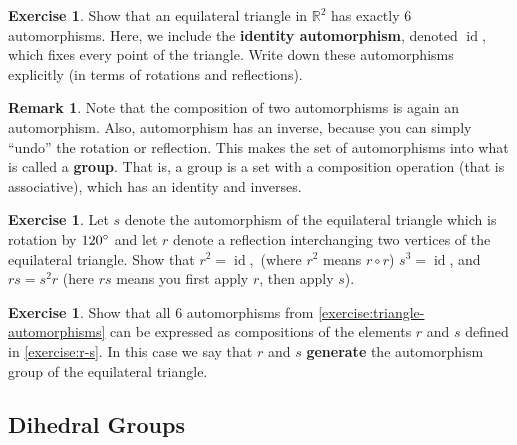 \documentclass[reqno, 12pt, letter]{article}
\theoremstyle{plain}
\theoremstyle{definition}
\newtheorem{remark}[theorem]{Remark}
\newtheorem{exercise}[theorem]{Exercise}
\theoremstyle{remark}
\numberwithin{equation}{section}
\newcommand\br{{\mathbb R}}
\DeclareMathOperator\id{id}
\begin{document}
\begin{exercise}
	\label{exercise:triangle-automorphisms}
	Show that an equilateral triangle in $\br^2$ has exactly $6$ automorphisms.
	Here, we include the {\bf identity automorphism}, denoted $\id$, which fixes every point of the triangle.
	Write down these automorphisms explicitly (in terms of rotations and reflections).
\end{exercise}
\begin{remark}
	\label{remark:aut-is-group}
	Note that the composition of two automorphisms is again an automorphism.
	Also, automorphism has an inverse, because you can simply ``undo'' the rotation or reflection.
	This makes the set of automorphisms into what is called a {\bf group}. That is,
	a group is a set with a composition operation (that is associative), which has an identity and inverses.
\end{remark}
\begin{exercise}
	\label{exercise:r-s}
	Let $s$ denote the automorphism of the equilateral triangle which is rotation by $120\degree$
	and let $r$ denote a reflection interchanging two vertices of the equilateral triangle.
	Show that $r^2= \id,$ (where $r^2$ means $r \circ r$) $s^3 = \id$, and $rs = s^2r$ (here $rs$ means you first apply $r$, then apply $s$).
\end{exercise}
\begin{exercise}
	\label{exercise:}
	Show that all $6$ automorphisms from \autoref{exercise:triangle-automorphisms} can be expressed as compositions
	of the elements $r$ and $s$ defined in \autoref{exercise:r-s}. In this case we say that $r$ and $s$ {\bf generate}
	the automorphism group of the equilateral triangle.
\end{exercise}

\subsection{Dihedral Groups}
\end{document}
